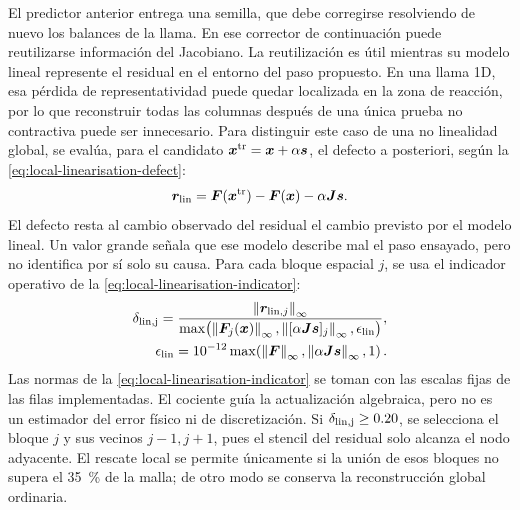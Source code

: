 \documentclass[12pt,a4paper,twoside,openany]{book}
\newcommand{\vect}[1]{\bm{#1}}
\newcommand{\mat}[1]{\bm{#1}}
\newcommand{\norm}[1]{\left\lVert #1\right\rVert}
\begin{document}
El predictor anterior entrega una semilla, que debe corregirse resolviendo
de nuevo los balances de la llama. En ese corrector de continuación puede
reutilizarse información del Jacobiano. La reutilización es útil mientras su
modelo lineal represente
el residual en el entorno del paso propuesto. En una llama 1D, esa pérdida de
representatividad puede quedar localizada en la zona de reacción, por lo que
reconstruir todas las columnas después de una única prueba no contractiva puede
ser innecesario. Para distinguir este caso de una no linealidad global, se
evalúa, para el candidato \(\vect{x}^{\rm tr}=\vect{x}+\alpha\vect{s}\), el
defecto a posteriori, según la \cref{eq:local-linearisation-defect}:
\begin{equation}
  \vect r_{\rm lin}=\vect F(\vect{x}^{\rm tr})-\vect F(\vect{x})
  -\alpha\mat J\vect{s}.
  \label{eq:local-linearisation-defect}
\end{equation}
El defecto resta al cambio observado del residual el cambio previsto por
el modelo lineal. Un valor grande señala que ese modelo describe mal el
paso ensayado, pero no identifica por sí solo su causa.
Para cada bloque espacial \(j\), se usa el indicador operativo de la \cref{eq:local-linearisation-indicator}:
\begin{equation}
 \begin{aligned}
  \delta_{\rm lin,j}=
  \frac{\norm{\vect r_{{\rm lin},j}}_\infty}
  {\max\!\left(\norm{\vect F_j(\vect{x})}_\infty,
  \norm{[\alpha\mat J\vect{s}]_j}_\infty,\epsilon_{\rm lin}\right)},\\
  \epsilon_{\rm lin}=10^{-12}\max\!\left(\norm{\vect F}_\infty,
  \norm{\alpha\mat J\vect{s}}_\infty,1\right).
 \end{aligned}
  \label{eq:local-linearisation-indicator}
\end{equation}
Las normas de la \cref{eq:local-linearisation-indicator} se toman con las
escalas fijas de las filas implementadas. El cociente guía la actualización
algebraica, pero no es un estimador del error físico ni de discretización. Si \(\delta_{\rm lin,j}\ge0.20\), se selecciona el
bloque \(j\) y sus vecinos \(j-1,j+1\), pues el stencil del residual solo
alcanza el nodo adyacente. El rescate local se permite únicamente si la unión
de esos bloques no supera el \SI{35}{\percent} de la malla; de otro modo se
conserva la reconstrucción global ordinaria.
\end{document}
